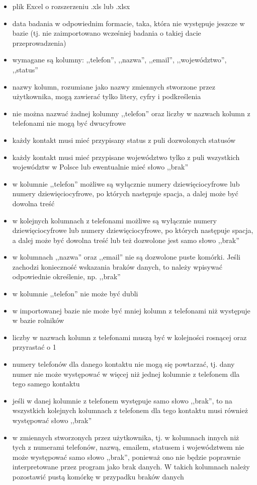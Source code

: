 \documentclass[12pt, twoside, hidelinks]{report}
\begin{document}
\begin{itemize}
\item plik Excel o rozszerzeniu .xls lub .xlsx
\item data badania w odpowiednim formacie, taka, która nie występuje jeszcze w bazie (tj. nie zaimportowano wcześniej badania o takiej dacie przeprowadzenia)
\item wymagane są kolumny: ,,telefon'', ,,nazwa'', ,,email'', ,,województwo'', ,,status''
\item nazwy kolumn, rozumiane jako nazwy zmiennych stworzone przez użytkownika, mogą zawierać tylko litery, cyfry i podkreślenia
\item nie można nazwać żadnej kolumny ,,telefon'' oraz liczby w nazwach kolumn z telefonami nie mogą być dwucyfrowe
\item każdy kontakt musi mieć przypisany status z puli dozwolonych statusów
\item każdy kontakt musi mieć przypisane województwo tylko z puli wszystkich województw w Polsce lub ewentualnie mieć słowo ,,brak''
\item w kolumnie ,,telefon'' możliwe są wyłącznie numery dziewięciocyfrowe lub numery dziewięciocyfrowe, po których następuje spacja, a dalej może być dowolna treść
\item w kolejnych kolumnach z telefonami możliwe są wyłącznie numery dziewięciocyfrowe lub numery dziewięciocyfrowe, po których następuje spacja, a dalej może być dowolna treść lub też dozwolone jest samo słowo ,,brak''
\item w kolumnach ,,nazwa'' oraz ,,email'' nie są dozwolone puste komórki. Jeśli zachodzi konieczność wskazania braków danych, to należy wpisywać odpowiednie określenie, np. ,,brak''
\item w kolumnie ,,telefon'' nie może być dubli
\item w importowanej bazie nie może być mniej kolumn z telefonami niż występuje w bazie rolników
\item liczby w nazwach kolumn z telefonami muszą być w kolejności rosnącej oraz przyrastać o 1
\item numery telefonów dla danego kontaktu nie mogą się powtarzać, tj. dany numer nie może występować w więcej niż jednej kolumnie z telefonem dla tego samego kontaktu
\item jeśli w danej kolumnie z telefonem występuje samo słowo ,,brak'', to na wszystkich kolejnych kolumnach z telefonem dla tego kontaktu musi również występować słowo ,,brak''
\item w zmiennych stworzonych przez użytkownika, tj. w kolumnach innych niż tych z numerami telefonów, nazwą, emailem, statusem i województwem nie może występować samo słowo ,,brak'', ponieważ ono nie będzie poprawnie interpretowane przez program jako brak danych. W takich kolumnach należy pozostawić pustą komórkę w przypadku braków danych
\end{itemize}
\end{document}
